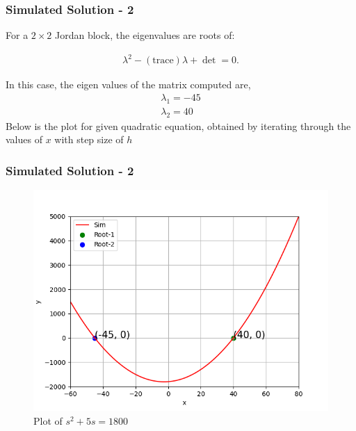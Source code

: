 \documentclass{beamer}
\theoremstyle{remark}
\numberwithin{equation}{section}
\begin{document}
\begin{frame}
	\frametitle{Simulated Solution - 2}
	For a \(2 \times 2\) Jordan block, the eigenvalues are roots of:

\begin{align}
\lambda^2 - (\text{trace})\lambda + \det = 0.
\end{align}

In this case, the eigen values of the matrix computed are,
\begin{align}
	\lambda_1 = -45\\
	\lambda_2 = 40
\end{align}
	Below is the plot for given quadratic equation, obtained by iterating through the values of $x$ with step size of $h$
\end{frame}
\begin{frame}
	\frametitle{Simulated Solution - 2}
	\begin{figure}[h!]
		\centering
		\includegraphics[width=1\columnwidth]{figs/simulated.png}
		\caption{Plot of $s^2 + 5s = 1800$}
		\label{stemplot}
	\end{figure}
\end{frame}
\end{document}
